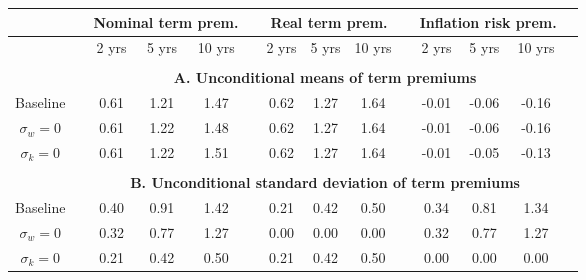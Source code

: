\begin{tabular}{cccccccccccccc} \hline &&\multicolumn{3}{c}{Nominal term prem.}&&\multicolumn{3}{c}{Real term prem.}&&\multicolumn{3}{c}{Inflation risk prem.}\\ \hline &&2 yrs& 5 yrs& 10 yrs&&2 yrs& 5 yrs& 10 yrs&&2 yrs& 5 yrs& 10 yrs\\ \hline \\ && \multicolumn{11}{c}{\bf{A. Unconditional means of term premiums}}\\ \hline Baseline & & 0.61 & 1.21 & 1.47 &  & 0.62 & 1.27 & 1.64 &  & -0.01 & -0.06 & -0.16 \\ $\sigma_w=0$ & & 0.61 & 1.22 & 1.48 &  & 0.62 & 1.27 & 1.64 &  & -0.01 & -0.06 & -0.16 \\ $\sigma_k=0$ & & 0.61 & 1.22 & 1.51 &  & 0.62 & 1.27 & 1.64 &  & -0.01 & -0.05 & -0.13 \\  \hline \\ && \multicolumn{11}{c}{\bf{B. Unconditional standard deviation of term premiums}}\\ \hline Baseline & & 0.40 & 0.91 & 1.42 &  & 0.21 & 0.42 & 0.50 &  & 0.34 & 0.81 & 1.34 \\ $\sigma_w=0$ & & 0.32 & 0.77 & 1.27 &  & 0.00 & 0.00 & 0.00 &  & 0.32 & 0.77 & 1.27 \\ $\sigma_k=0$ & & 0.21 & 0.42 & 0.50 &  & 0.21 & 0.42 & 0.50 &  & 0.00 & 0.00 & 0.00 \\ \hline \end{tabular}
